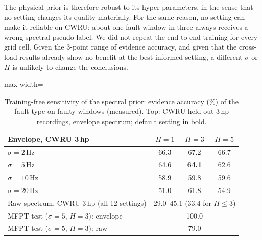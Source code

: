 \documentclass[conference]{IEEEtran}
\begin{document}
The physical prior is therefore robust to its hyper-parameters, in the sense
that no setting changes its quality materially. For the same reason, no
setting can make it reliable on CWRU: about one fault window in three always
receives a wrong spectral pseudo-label. We did not repeat the end-to-end
training for every grid cell. Given the 3-point range of evidence accuracy, and
given that the cross-load results already show no benefit at the best-informed
setting, a different $\sigma$ or $H$ is unlikely to change the conclusions.

\begin{table}[t]
\caption{Training-free sensitivity of the spectral prior: evidence accuracy
(\%) of the fault type on faulty windows (measured). Top: CWRU held-out
3\,hp recordings, envelope spectrum; default setting in bold.}
\label{tab:sens}
\centering
\footnotesize
\begin{adjustbox}{max width=\columnwidth}
\begin{tabular}{lccc}
\toprule
Envelope, CWRU 3\,hp & $H=1$ & $H=3$ & $H=5$ \\
\midrule
$\sigma=2$\,Hz  & 66.3 & 67.2 & 66.7 \\
$\sigma=5$\,Hz  & 64.6 & \textbf{64.1} & 62.6 \\
$\sigma=10$\,Hz & 58.9 & 59.8 & 59.6 \\
$\sigma=20$\,Hz & 51.0 & 61.8 & 54.9 \\
\midrule
Raw spectrum, CWRU 3\,hp (all 12 settings) & \multicolumn{3}{c}{29.0--45.1 (33.4 for $H\le3$)} \\
\midrule
MFPT test ($\sigma=5$, $H=3$): envelope & \multicolumn{3}{c}{100.0} \\
MFPT test ($\sigma=5$, $H=3$): raw & \multicolumn{3}{c}{79.0} \\
\bottomrule
\end{tabular}
\end{adjustbox}
\end{table}
\end{document}
